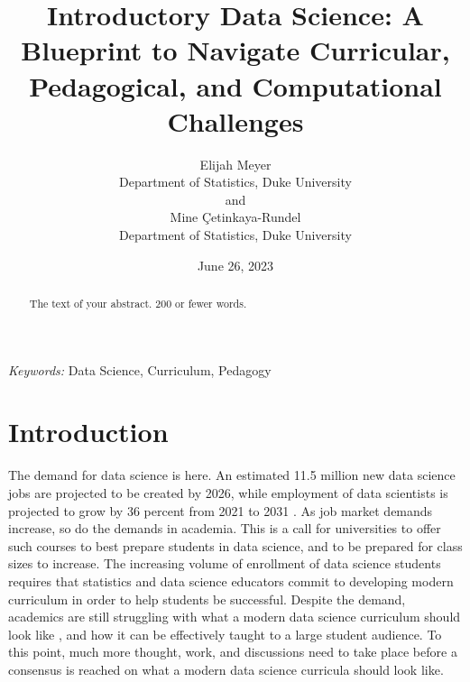 \documentclass[
  12pt]{article}
\begin{document}
\def\spacingset#1{\renewcommand{\baselinestretch}%
{#1}\small\normalsize} \spacingset{1}



\date{June 26, 2023}
\title{\bf Introductory Data Science: A Blueprint to Navigate
Curricular, Pedagogical, and Computational Challenges}
\author{
Elijah Meyer\\
Department of Statistics, Duke University\\
and\\Mine Çetinkaya-Rundel\\
Department of Statistics, Duke University\\
}
\maketitle

\bigskip
\bigskip
\begin{abstract}
The text of your abstract. 200 or fewer words.
\end{abstract}

\noindent%
{\it Keywords:} Data Science, Curriculum, Pedagogy
\vfill

\newpage
\spacingset{1.9} %
\ifdefined\Shaded\renewenvironment{Shaded}{\begin{tcolorbox}[frame hidden, sharp corners, boxrule=0pt, interior hidden, borderline west={3pt}{0pt}{shadecolor}, enhanced, breakable]}{\end{tcolorbox}}\fi

\hypertarget{introduction}{%
\section{Introduction}\label{introduction}}

The demand for data science is here. An estimated 11.5 million new data
science jobs are projected to be created by 2026, while employment of
data scientists is projected to grow by 36 percent from 2021 to 2031
\citep{labor_2022}. As job market demands increase, so do the demands in
academia. This is a call for universities to offer such courses to best
prepare students in data science, and to be prepared for class sizes to
increase. The increasing volume of enrollment of data science students
\citep{Redmond2022} requires that statistics and data science educators
commit to developing modern curriculum in order to help students be
successful. Despite the demand, academics are still struggling with what
a modern data science curriculum should look like \citep{Schwab2020},
and how it can be effectively taught to a large student audience. To
this point, much more thought, work, and discussions need to take place
before a consensus is reached on what a modern data science curricula
should look like.
\end{document}
